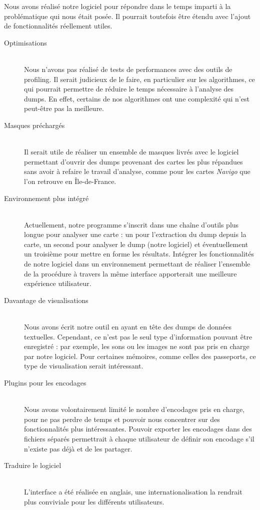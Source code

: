 Nous avons réalisé notre logiciel pour répondre dans le temps imparti à la problématique qui nous était posée. Il pourrait toutefois être étendu avec l'ajout de fonctionnalités réellement utiles.

\begin{description}
  \item[Optimisations] \hfill \\
  Nous n'avons pas réalisé de tests de performances avec des outils de profiling.
  Il serait judicieux de le faire, en particulier sur les algorithmes, ce qui pourrait permettre de réduire le temps nécessaire à l'analyse des dumps. En effet, certains de nos algorithmes ont une complexité qui n'est peut-être pas la meilleure.

  \item[Masques préchargés] \hfill \\
  Il serait utile de réaliser un ensemble de masques livrés avec le logiciel permettant d'ouvrir des dumps provenant des cartes les plus répandues sans avoir à refaire le travail d'analyse, comme pour les cartes \emph{Navigo} que l'on retrouve en Île-de-France.

  \item[Environnement plus intégré] \hfill \\
  Actuellement, notre programme s'inscrit dans une chaîne d'outils plus longue pour analyser une carte : un pour l'extraction du dump depuis la carte, un second pour analyser le dump (notre logiciel) et éventuellement un troisième pour mettre en forme les résultats. Intégrer les fonctionnalités de notre logiciel dans un environnement permettant de réaliser l'ensemble de la procédure à travers la même interface apporterait une meilleure expérience utilisateur.

  \item[Davantage de visualisations] \hfill \\
  Nous avons écrit notre outil en ayant en tête des dumps de données textuelles. Cependant, ce n'est pas le seul type d'information pouvant être enregistré : par exemple, les sons ou les images ne sont pas pris en charge par notre logiciel. Pour certaines mémoires, comme celles des passeports, ce type de visualisation serait intéressant.

  \item[Plugins pour les encodages] \hfill \\
  Nous avons volontairement limité le nombre d'encodages pris en charge, pour ne pas perdre de temps et pouvoir nous concentrer sur des fonctionnalités plus intéressantes. Pouvoir exporter les encodages dans des fichiers séparés permettrait à chaque utilisateur de définir son encodage s'il n'existe pas déjà et de les partager.

  \item[Traduire le logiciel] \hfill \\
  L'interface a été réalisée en anglais, une internationalisation la rendrait plus conviviale pour les différents utilisateurs.
\end{description}
